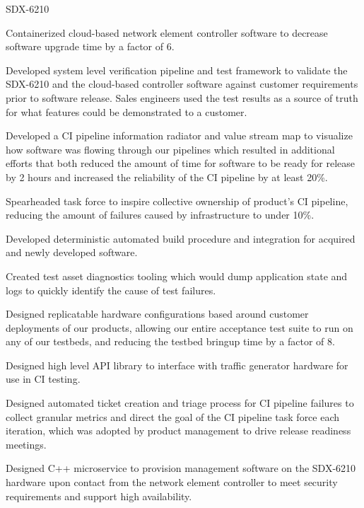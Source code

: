 \begin{cventries}
  \cventry
    {
} {SDX-6210} {} {} {
      \begin{cvitems} %
        \item {Containerized cloud-based network element controller software to decrease software upgrade time by a factor of 6.}
        \item {Developed system level verification pipeline and test framework to validate the SDX-6210 and the cloud-based controller software against customer requirements prior to software release. Sales engineers used the test results as a source of truth for what features could be demonstrated to a customer.}
        \item {Developed a CI pipeline information radiator and value stream map to visualize how software was flowing through our pipelines which resulted in additional efforts that both reduced the amount of time for software to be ready for release by 2 hours and increased the reliability of the CI pipeline by at least 20\%.}
        \item {Spearheaded task force to inspire collective ownership of product's CI pipeline, reducing the amount of failures caused by infrastructure to under 10\%.}
        \item {Developed deterministic automated build procedure and integration for acquired and newly developed software.}
        \item {Created test asset diagnostics tooling which would dump application state and logs to quickly identify the cause of test failures.}
        \item {Designed replicatable hardware configurations based around customer deployments of our products, allowing our entire acceptance test suite to run on any of our testbeds, and reducing the testbed bringup time by a factor of 8.}
        \item {Designed high level API library to interface with traffic generator hardware for use in CI testing.}
        \item {Designed automated ticket creation and triage process for CI pipeline failures to collect granular metrics and direct the goal of the CI pipeline task force each iteration, which was adopted by product management to drive release readiness meetings.}
        \item {Designed C++ microservice to provision management software on the SDX-6210 hardware upon contact from the network element controller to meet security requirements and support high availability.}
      \end{cvitems}
    }


\end{cventries}
